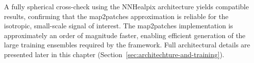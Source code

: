 A fully spherical cross-check using the NNHealpix architecture \cite{Krachmalnicoff:2019} yields compatible results, confirming that the map2patches approximation is reliable for the isotropic, small-scale signal of interest.
The map2patches implementation is approximately an order of magnitude faster, enabling efficient generation of the large training ensembles required by the \SBI framework.
Full architectural details are presented later in this chapter (Section~\ref{sec:architechture-and-training}).
